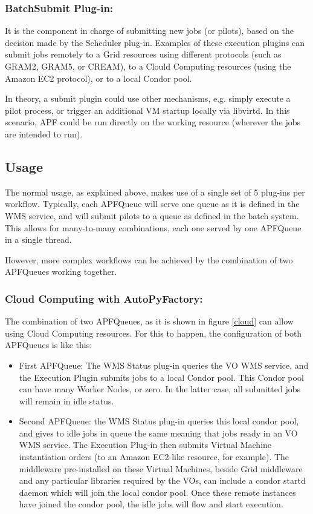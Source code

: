 \documentclass[a4paper]{jpconf}
\begin{document}
\subsubsection{BatchSubmit Plug-in:}
It is the component in charge of submitting new jobs (or pilots), 
based on the decision made by the Scheduler plug-in. 
Examples of these execution plugins can submit jobs remotely to a Grid resources using different protocols 
(such as GRAM2, GRAM5, or CREAM), to a Clould Computing resources (using the
Amazon EC2 protocol), or to a local Condor pool. 

In theory, a submit plugin
could use other mechanisms, e.g. simply execute a pilot process, or trigger an
additional VM startup locally via libvirtd. In this scenario, APF could be run
directly on the working resource (wherever the jobs are intended to run).


\subsection{Usage}

The normal usage, as explained above, 
makes use of a single set of 5 plug-ins per workflow. 
Typically, each APFQueue will serve one queue as it is defined in the WMS service, 
and will submit pilots to a queue as defined in the batch system. 
This allows for many-to-many combinations, each one served by one APFQueue in a single thread. 

However, more complex workflows can be achieved by the combination of two APFQueues working together.

\subsubsection{Cloud Computing with AutoPyFactory:}
The combination of two APFQueues, 
as it is shown in figure \ref{cloud}
can allow using Cloud Computing resources. 
For this to happen, the configuration of both APFQueues is like this:

\begin{itemize}
\item First APFQueue: 
The WMS Status plug-in queries the VO WMS service, and the Execution Plugin
submits jobs  to a local Condor pool.
This Condor pool can have many Worker Nodes, or zero. 
In the latter case, all submitted jobs will remain in idle status. 
\item Second APFQueue: 
the WMS Status plug-in queries this local condor pool, 
and gives to idle jobs in queue the same meaning that jobs ready in an VO WMS service. 
The Execution Plug-in then submits Virtual Machine instantiation orders (to an Amazon EC2-like resource, for example). 
The middleware pre-installed on these Virtual Machines, 
beside Grid middleware and any particular libraries required by the VOs, 
can include a condor startd daemon which will join the local condor pool. 
Once these remote instances have joined the condor pool, 
the idle jobs will flow and start execution. 
\end{itemize}
\end{document}
